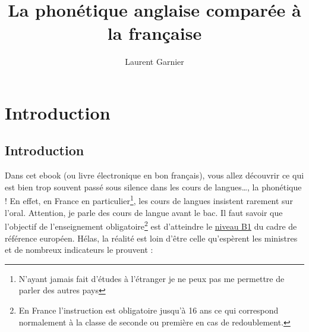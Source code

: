 \documentclass[12pt,a4paper]{book}
\newcommand{\exFR}[1]{%
  \textcolor{olive}{\textcursive{#1}}}
\begin{document}
\title{La phonétique anglaise comparée à la française}
\author{Laurent Garnier}

\maketitle
\tableofcontents

\part{Introduction}

\chapter{Introduction}
\label{sec:org9288afb}
Dans cet ebook (ou livre électronique en bon français), vous allez
découvrir ce qui est bien trop souvent passé sous silence dans les
cours de langues\ldots{}, la phonétique ! En effet, en France en
particulier\footnote{N'ayant jamais fait d'études à l'étranger je ne
  peux pas me permettre de parler des autres pays}, les cours de
langues insistent rarement sur l'oral. Attention, je parle des cours
de langue avant le bac. Il faut savoir que \exFR{normalement}
l'objectif de l'enseignement obligatoire\footnote{En France
  l'instruction est obligatoire jusqu'à 16 ans ce qui correspond
  normalement à la classe de seconde ou première en cas de
  redoublement.} est d'atteindre le
\href{http://www.cambridgeenglish.org/fr/exams-and-tests/cambridge-english-certificate-cec/}{niveau
  B1} du cadre de référence européen. Hélas, la réalité est
loin d'être celle qu'espèrent les ministres et de nombreux indicateurs le prouvent :
\end{document}
